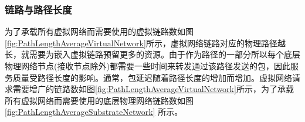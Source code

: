 \subsubsection{链路与路径长度}
为了承载所有虚拟网络而需要使用的虚拟链路数如图\ref{fig:PathLengthAverageVirtualNetwork}所示，虚拟网络链路对应的物理路径越长，就需要为嵌入虚拟链路预留更多的资源。由于作为路径的一部分所以每个底层物理网络节点(接收节点除外)都需要一些时间来转发通过该路径发送的包，因此服务质量受路径长度的影响。通常，包延迟随着路径长度的增加而增加。虚拟网络请求需要增广的链路数如图\ref{fig:PathLengthAverageVirtualNetwork}所示，为了承载所有虚拟网络而需要使用的底层物理网络链路数如图\ref{fig:PathLengthAverageSubstrateNetwork} 所示。
